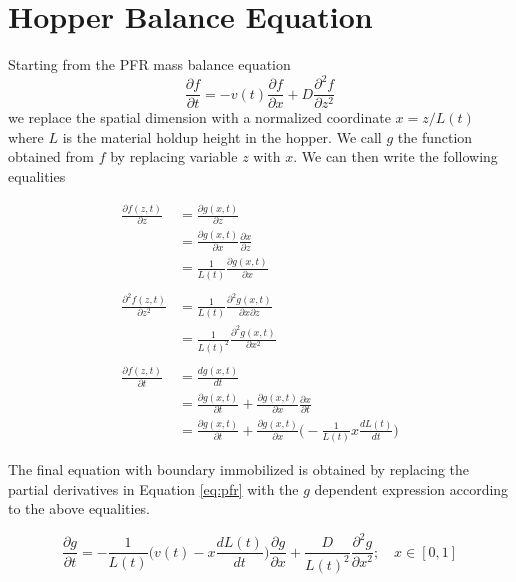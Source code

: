 \documentclass{article}
\begin{document}
\section{Hopper Balance Equation}
\label{sec:hopper_balance}
Starting from the PFR mass balance equation
\begin{equation}
    \frac{\partial f}{\partial t} = - v(t)\frac{\partial f}{\partial x} + D\frac{\partial^2 f}{\partial z^2}
\end{equation}
we replace the spatial dimension with a normalized coordinate $x = z/L(t)$ where $L$ is the material holdup height in the hopper. We call $g$ the function obtained from $f$ by replacing variable $z$ with $x$. We can then write the following equalities

\begin{equation}
    \label{eq:pfr}
    \begin{split}
        \frac{\partial f(z, t)}{\partial z}     & = \frac{\partial g(x, t)}{\partial z}                                                                                     \\
                                                & = \frac{\partial g(x, t)}{\partial x} \frac{\partial x}{\partial z}                                                       \\
                                                & = \frac{1}{L(t)}\frac{\partial g(x, t)}{\partial x}                                                                       \\ & \\
        \frac{\partial^2 f(z, t)}{\partial z^2} & = \frac{1}{L(t)}\frac{\partial^2 g(x, t)}{\partial x \partial z}                                                          \\
                                                & = \frac{1}{L(t)^2}\frac{\partial^2 g(x, t)}{\partial x^2}                                                                 \\ &\\
        \frac{\partial f(z, t)}{\partial t}     & = \frac{dg(x, t)}{dt}                                                                                                     \\
                                                & = \frac{\partial g(x, t)}{ \partial t} + \frac{\partial g(x, t)}{\partial x}\frac{\partial x}{\partial t}                 \\
                                                & = \frac{\partial g(x, t)}{ \partial t} + \frac{\partial g(x, t)}{\partial x} \bigg(-\frac{1}{L(t)}x\frac{dL(t)}{dt}\bigg)
    \end{split}
\end{equation}

The final equation with boundary immobilized is obtained by replacing the partial derivatives in Equation \ref{eq:pfr} with the $g$ dependent expression according to the above equalities.

\begin{equation}
    \frac{\partial g}{\partial t} = - \frac{1}{L(t)}\bigg(v(t) - x\frac{dL(t)}{dt}\bigg)\frac{\partial g}{\partial x} + \frac{D}{L(t)^2}\frac{\partial^2 g}{\partial x^2}; \quad x \in [0, 1]
\end{equation}
\end{document}
